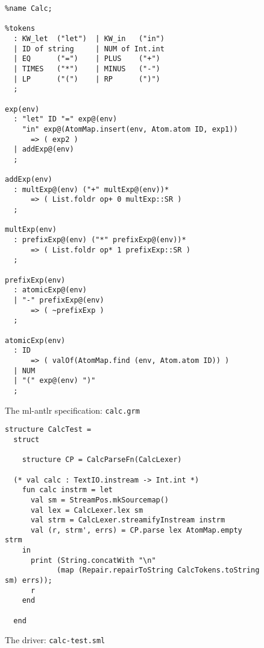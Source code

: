 \begin{figure}[p]
\begin{verbatim}
%name Calc;

%tokens
  : KW_let  ("let")  | KW_in   ("in")
  | ID of string     | NUM of Int.int
  | EQ      ("=")    | PLUS    ("+")
  | TIMES   ("*")    | MINUS   ("-")
  | LP      ("(")    | RP      (")")
  ;
  
exp(env)
  : "let" ID "=" exp@(env) 
    "in" exp@(AtomMap.insert(env, Atom.atom ID, exp1))
      => ( exp2 )
  | addExp@(env)
  ;
  
addExp(env)
  : multExp@(env) ("+" multExp@(env))*
      => ( List.foldr op+ 0 multExp::SR )
  ;
  
multExp(env)
  : prefixExp@(env) ("*" prefixExp@(env))*
      => ( List.foldr op* 1 prefixExp::SR )
  ;
  
prefixExp(env)
  : atomicExp@(env)
  | "-" prefixExp@(env)
      => ( ~prefixExp )
  ;
  
atomicExp(env)
  : ID  
      => ( valOf(AtomMap.find (env, Atom.atom ID)) )
  | NUM
  | "(" exp@(env) ")"
  ;
\end{verbatim}
\caption{The ml-antlr specification: {\tt calc.grm}}
\label{fig:calc-grm}
\end{figure}

\begin{figure}
\begin{verbatim}
structure CalcTest =
  struct

    structure CP = CalcParseFn(CalcLexer)

  (* val calc : TextIO.instream -> Int.int *)
    fun calc instrm = let
      val sm = StreamPos.mkSourcemap()
      val lex = CalcLexer.lex sm
      val strm = CalcLexer.streamifyInstream instrm
      val (r, strm', errs) = CP.parse lex AtomMap.empty strm
    in
      print (String.concatWith "\n" 
            (map (Repair.repairToString CalcTokens.toString sm) errs));
      r
    end

  end
\end{verbatim}
\caption{The driver: {\tt calc-test.sml}}
\label{fig:calc-test}
\end{figure}